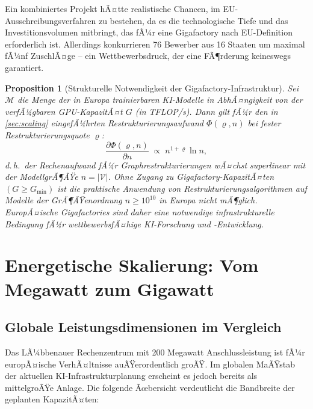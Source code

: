 ﻿\documentclass[12pt, a4paper, openany]{report}
\newtheorem{proposition}[theorem]{Proposition}
\newcommand{\calV}{\mathcal{V}}
\begin{document}
Ein kombiniertes Projekt hÃ¤tte realistische Chancen, im EU-Ausschreibungsverfahren
zu bestehen, da es die technologische Tiefe und das Investitionsvolumen
mitbringt, das fÃ¼r eine Gigafactory nach EU-Definition erforderlich ist.
Allerdings konkurrieren 76 Bewerber aus 16 Staaten um maximal fÃ¼nf
ZuschlÃ¤ge -- ein Wettbewerbsdruck, der eine FÃ¶rderung keineswegs garantiert.

\begin{proposition}[Strukturelle Notwendigkeit der Gigafactory-Infrastruktur]
	\label{prop:gigafactory_notwendigkeit}
	Sei $\mathcal{M}$ die Menge der in Europa trainierbaren KI-Modelle in
	AbhÃ¤ngigkeit von der verfÃ¼gbaren GPU-KapazitÃ¤t $G$ (in TFLOP/s). Dann
	gilt fÃ¼r den in \cref{sec:scaling} eingefÃ¼hrten Restrukturierungsaufwand
	$\Phi(\varrho, n)$ bei fester Restrukturierungsquote $\varrho$:
	\[
	\frac{\partial \Phi(\varrho, n)}{\partial n}
	\;\propto\; n^{1 + \varrho} \ln n,
	\]
	d.\,h.\ der Rechenaufwand fÃ¼r Graphrestrukturierungen wÃ¤chst
	superlinear mit der ModellgrÃ¶ÃŸe $n = |\calV|$. Ohne Zugang zu
	Gigafactory-KapazitÃ¤ten $(G \geq G_{\min})$ ist die praktische Anwendung
	von Restrukturierungsalgorithmen auf Modelle der GrÃ¶ÃŸenordnung $n \geq 10^{10}$
	in Europa nicht mÃ¶glich. EuropÃ¤ische Gigafactories sind daher eine
	\emph{notwendige} infrastrukturelle Bedingung fÃ¼r wettbewerbsfÃ¤hige
	KI-Forschung und -Entwicklung.
\end{proposition}

\section{Energetische Skalierung: Vom Megawatt zum Gigawatt}
\label{sec:energetische_skalierung}

\subsection{Globale Leistungsdimensionen im Vergleich}

Das LÃ¼bbenauer Rechenzentrum mit 200 Megawatt Anschlussleistung ist fÃ¼r
europÃ¤ische VerhÃ¤ltnisse auÃŸerordentlich groÃŸ. Im globalen MaÃŸstab der
aktuellen KI-Infrastrukturplanung erscheint es jedoch bereits als
mittelgroÃŸe Anlage. Die folgende Ãœbersicht verdeutlicht die Bandbreite
der geplanten KapazitÃ¤ten:
\end{document}
